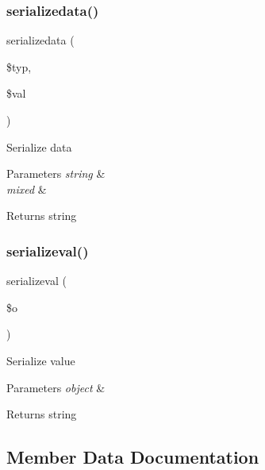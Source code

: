 \subsubsection{\texorpdfstring{serializedata()}{serializedata()}}
{\footnotesize\ttfamily serializedata (\begin{DoxyParamCaption}\item[{}]{\$typ,  }\item[{}]{\$val }\end{DoxyParamCaption})}

Serialize data


\begin{DoxyParams}{Parameters}
{\em string} & \\
\hline
{\em mixed} & \\
\hline
\end{DoxyParams}
\begin{DoxyReturn}{Returns}
string 
\end{DoxyReturn}
\mbox{\label{class_x_m_l___r_p_c___values_a1a4bfc79985c185745d96ebe3a1e5c3d}} 
\subsubsection{\texorpdfstring{serializeval()}{serializeval()}}
{\footnotesize\ttfamily serializeval (\begin{DoxyParamCaption}\item[{}]{\$o }\end{DoxyParamCaption})}

Serialize value


\begin{DoxyParams}{Parameters}
{\em object} & \\
\hline
\end{DoxyParams}
\begin{DoxyReturn}{Returns}
string 
\end{DoxyReturn}


\subsection{Member Data Documentation}
\mbox{\label{class_x_m_l___r_p_c___values_ad856a60cee1894f180e845f9b7b81458}} 
